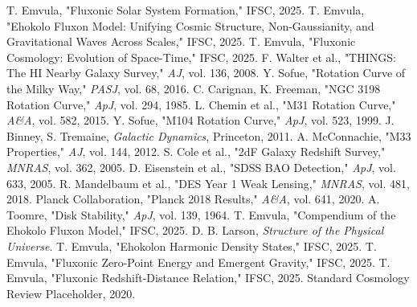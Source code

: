 \documentclass[11pt]{article}
\begin{document}
\begin{thebibliography}{21}
\raggedright
{} T. Emvula, "Fluxonic Solar System Formation," IFSC, 2025.
 T. Emvula, "Ehokolo Fluxon Model: Unifying Cosmic Structure, Non-Gaussianity, and Gravitational Waves Across Scales," IFSC, 2025.
 T. Emvula, "Fluxonic Cosmology: Evolution of Space-Time," IFSC, 2025.
 F. Walter et al., "THINGS: The HI Nearby Galaxy Survey," \textit{AJ}, vol. 136, 2008.
 Y. Sofue, "Rotation Curve of the Milky Way," \textit{PASJ}, vol. 68, 2016.
 C. Carignan, K. Freeman, "NGC 3198 Rotation Curve," \textit{ApJ}, vol. 294, 1985.
 L. Chemin et al., "M31 Rotation Curve," \textit{A\&A}, vol. 582, 2015.
 Y. Sofue, "M104 Rotation Curve," \textit{ApJ}, vol. 523, 1999.
 J. Binney, S. Tremaine, \textit{Galactic Dynamics}, Princeton, 2011.
 A. McConnachie, "M33 Properties," \textit{AJ}, vol. 144, 2012.
 S. Cole et al., "2dF Galaxy Redshift Survey," \textit{MNRAS}, vol. 362, 2005.
 D. Eisenstein et al., "SDSS BAO Detection," \textit{ApJ}, vol. 633, 2005.
 R. Mandelbaum et al., "DES Year 1 Weak Lensing," \textit{MNRAS}, vol. 481, 2018.
 Planck Collaboration, "Planck 2018 Results," \textit{A\&A}, vol. 641, 2020.
 A. Toomre, "Disk Stability," \textit{ApJ}, vol. 139, 1964.
 T. Emvula, "Compendium of the Ehokolo Fluxon Model," IFSC, 2025.
 D. B. Larson, \textit{Structure of the Physical Universe}.
 T. Emvula, "Ehokolon Harmonic Density States," IFSC, 2025.
 T. Emvula, "Fluxonic Zero-Point Energy and Emergent Gravity," IFSC, 2025.
 T. Emvula, "Fluxonic Redshift-Distance Relation," IFSC, 2025.
 Standard Cosmology Review Placeholder, 2020.
\end{thebibliography}
\end{document}
